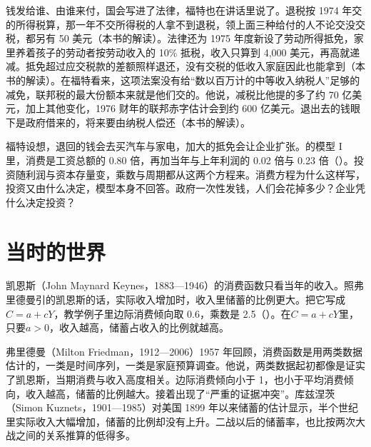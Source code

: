 钱发给谁、由谁来付，国会写进了法律，福特也在讲话里说了。退税按 1974 年交的所得税算，那一年不交所得税的人拿不到退税，领上面三种给付的人不论交没交税，都另有 50 美元（本书的解读）。法律还为 1975 年度新设了劳动所得抵免，家里养着孩子的劳动者按劳动收入的 10\% 抵税，收入只算到 4,000 美元，再高就递减\cite{pl9412}。抵免超过应交税款的差额照样退还，没有交税的低收入家庭因此也能拿到（本书的解读）\cite{pl9412}。在福特看来，这项法案没有给“数以百万计的中等收入纳税人”足够的减免，联邦税的最大份额本来就是他们交的\cite{ford1975}。他说，减税比他提的多了约 70 亿美元，加上其他变化，1976 财年的联邦赤字估计会到约 600 亿美元\cite{ford1975}。退出去的钱眼下是政府借来的，将来要由纳税人偿还（本书的解读）。

福特设想，退回的钱会去买汽车与家电，加大的抵免会让企业扩张\cite{ford1975}。的模型 I 里，消费是工资总额的 0.80 倍，再加当年与上年利润的 0.02 倍与 0.23 倍（）。投资随利润与资本存量变，乘数与周期都从这两个方程来。消费方程为什么这样写，投资又由什么决定，模型本身不回答。政府一次性发钱，人们会花掉多少？企业凭什么决定投资？

\section{当时的世界}\label{sec:consumption-world}

凯恩斯（John Maynard Keynes，1883—1946）的消费函数只看当年的收入\cite{loc39}。照弗里德曼引的凯恩斯的话，实际收入增加时，收入里储蓄的比例更大\cite{friedman1957}。把它写成$C=a+cY$，教学例子里边际消费倾向取 0.6，乘数是 2.5（）。在$C=a+cY$里，只要$a>0$，收入越高，储蓄占收入的比例就越高。

弗里德曼（Milton Friedman，1912—2006）1957 年回顾，消费函数是用两类数据估计的，一类是时间序列，一类是家庭预算调查\cite{friedman1957,loc39}。他说，两类数据起初都像是证实了凯恩斯，当期消费与收入高度相关\cite{friedman1957}。边际消费倾向小于 1，也小于平均消费倾向，收入越高，储蓄的比例越大\cite{friedman1957}。接着出现了“严重的证据冲突”\cite{friedman1957}。库兹涅茨（Simon Kuznets，1901—1985）对美国 1899 年以来储蓄的估计显示，半个世纪里实际收入大幅增加，储蓄的比例却没有上升\cite{friedman1957,loc39}。二战以后的储蓄率，也比按两次大战之间的关系推算的低得多\cite{friedman1957}。

